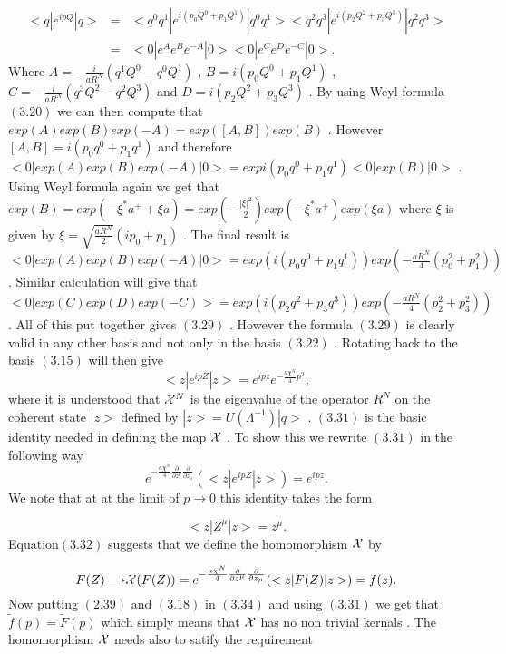 \documentclass[a4paper,12pt]{article}
\begin{document}
\begin{eqnarray}
<q|e^{ipQ}|q>&=&<q^0q^1|e^{i(p_0Q^0 +p_1Q^1)}|q^0q^1><q^2q^3|e^{i(p_2Q^2 +p_3Q^3)}|q^2q^3>\nonumber\\
&=&<0|e^{A}e^{B}e^{-A}|0><0|e^{C}e^{D}e^{-C}|0>.
\end{eqnarray}
Where $A=-\frac{i}{aR^N}(q^1Q^0 - q^0Q^1)$ , $B=i(p_0Q^0 +
p_1Q^1)$ , $C=-\frac{i}{aR^N}(q^3Q^2 - q^2Q^3)$ and $D=i(p_2Q^2 +
p_3Q^3)$ . By using Weyl formula $(3.20)$ we can then compute that
$exp{(A)}exp{(B)}exp{(-A)}=exp{([A,B])}exp{(B)}$ . However
$[A,B]=i(p_0q^0 + p_1q^1)$ and therefore
$<0|exp{(A)}exp{(B)}exp{(-A)}|0>=exp{i(p_0q^0 +
p_1q^1)}<0|exp{(B)}|0> $ . Using Weyl formula again we get that
$exp{(B)}=exp{(-{\xi}^{*}a^{+} +
{\xi}a)}=exp{(-\frac{|{\xi}|^2}{2})}
exp{(-{\xi}^{*}a^{+})}exp{({\xi}a)}$ where ${\xi}$ is given by
${\xi}=\sqrt{\frac{aR^N}{2}}(ip_0+p_1)$ . The final result is
$<0|exp{(A)}exp{(B)}exp{(-A)}|0>=exp{(i(p_0q^0 +
p_1q^1))}exp{(-\frac{aR^N}{4}(p_0^2 + p_1^2))} $ . Similar
calculation will give that
$<0|exp{(C)}exp{(D)}exp{(-C)}>=exp{(i(p_2q^2 +
p_3q^3))}exp{(-\frac{aR^N}{4}(p_2^2 + p_3^2))}$ . All of this put
together gives $(3.29)$ .
 However the formula $(3.29)$ is clearly valid in any other basis and not only in the basis $(3.22)$ .
Rotating back to the basis $(3.15)$ will then give
\begin{equation}
<z|e^{ipZ}|z>=e^{ipz}e^{-\frac{a{\chi}^N}{4}p^2},
\end{equation}
where it is understood that ${\cal X}^N $ is the eigenvalue of the
operator $R^N$ on the coherent state  $|z>$ defined by
$|z>=U({\Lambda}^{-1})|q>$ . $(3.31)$ is the basic identity
needed in defining the map ${\cal X}$ . To show this we rewrite
$(3.31)$ in the following way
\begin{equation}
e^{-\frac{a{\chi}^N}{4}{\frac{\partial}{{\partial}z^{\mu}}}{\frac{\partial}{{\partial}z_{\mu}}}}(<z|e^{ipZ}|z>)=e^{ipz}.
\end{equation}
We note that at at the limit of $p{\longrightarrow}0$ this
identity takes the form

\begin{equation}
<z|Z^{\mu}|z>=z^{\mu}.
\end{equation}
Equation$(3.32)$ suggests that we define the homomorphism ${\cal
X}$ by

\begin{equation}
F(Z){\longrightarrow}{\cal
X}(F(Z))=e^{-\frac{a{\chi}^N}{4}{\frac{\partial}{{\partial}z^{\mu}}}{\frac{\partial}{{\partial}z_{\mu}}}}(<z|F(Z)|z>)=f(z).
\end{equation}
Now putting $(2.39)$ and $(3.18)$ in $(3.34)$ and using $(3.31)$
we get that $ \tilde{f}(p)=\tilde{F}(p) $ which simply means that
${\cal X}$ has no non trivial kernals \cite{klauder}. The
homomorphism ${\cal X}$ needs also to satify the requirement
\end{document}
